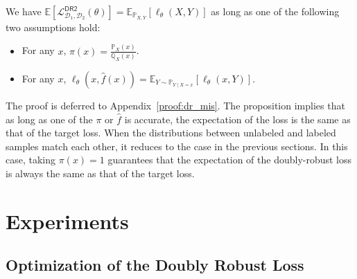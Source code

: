 \begin{proposition}\label{prop:dr_mis}
We have $ \mathbb{E}[\mathcal{L}^{\mathsf{DR2}}_{\mathcal{D}_1,\mathcal{D}_2}(\theta) ] = \mathbb{E}_{\mathbb{P}_{X, Y}}[\ell_\theta(X, Y)]$ as long as one of the following two assumptions hold:
        \begin{itemize}
            \item For any $x$, $\pi(x) = \frac{\mathbb{P}_X(x)}{\mathbb{Q}_X(x)}$.
            \item For any $x$, $\ell_\theta(x, \hat f(x))  = \mathbb{E}_{ Y\sim \mathbb{P}_{Y\mid X=x}}[\ell_\theta(x, Y)]$.
        \end{itemize}
\end{proposition}
The proof is deferred to Appendix~\ref{proof:dr_mis}. 
The proposition implies that  as long as one of the $\pi$ or 
$\hat f$ is accurate, the expectation of the loss is the same as that of the target loss. When the distributions between unlabeled and labeled samples match each other, it reduces to the case in the previous sections. In this case, taking $\pi(x)=1$ guarantees that the expectation of the doubly-robust loss is always the same as that of the target loss. 
\section{Experiments}\label{sec:empirical}


\subsection{Optimization of the Doubly Robust Loss}

